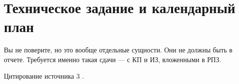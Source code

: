 \section{Техническое задание и календарный план}

Вы не поверите, но это вообще отдельные сущности. Они не должны быть
в отчете. Требуется именно такая сдачи --- с КП и ИЗ, вложенными в РПЗ.

\lipsum[1-2]

Цитирование источника 3 \cite{Wikipedia3}.

